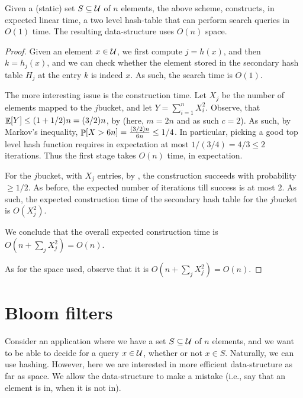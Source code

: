\begin{theorem}
    Given a (static) set $S \subseteq \mathcal{U}$ of $n$ elements, the above
    scheme, constructs, in expected linear time, a two level
    hash-table that can perform search queries in $O(1)$ time. The
    resulting data-structure uses $O(n)$ space.
\end{theorem}
\begin{proof}   
    Given an element $x \in \mathcal{U}$, we first compute $j = h(x)$, and
    then $k = h_j(x)$, and we can check whether the element stored in
    the secondary hash table $H_j$ at the entry $k$ is indeed $x$. As
    such, the search time is $O(1)$.

    The more interesting issue is the construction time.  Let $X_j$ be
    the number of elements mapped to the $j$\th bucket, and let
    $Y = \sum_{i=1}^n X_i^2$.  Observe, that
    $\mathop{\mathbb{E}}\!\left[ {Y} \right] \leq (1+ 1/2)n =(3/ 2)n$, by 
    (here, $m=2n$ and as such $c=2$). As such, by Markov's inequality,
    $\Prob{X > 6n} = \frac{(3/2)n}{6n} \leq 1/4$. In particular,
    picking a good top level hash function requires in expectation at
    most $1/(3/4)=4/3 \leq 2$ iterations. Thus the first stage takes
    $O(n)$ time, in expectation.

    For the $j$\th bucket, with $X_j$ entries, by
    , the construction succeeds with probability
    $\geq 1/2$. As before, the expected number of iterations till
    success is at most $2$. As such, the expected construction time of
    the secondary hash table for the $j$\th bucket is $O(X_j^2)$.

    We conclude that the overall expected construction time is
    $O( n + \sum_j X_j^2 ) = O(n)$.

    As for the space used, observe that it is $O(n + \sum_j X_j^2 ) =
    O(n)$.    
\end{proof}



\section{Bloom filters}

Consider an application where we have a set $S \subseteq \mathcal{U}$ of $n$
elements, and we want to be able to decide for a query $x \in \mathcal{U}$,
whether or not $x \in S$. Naturally, we can use hashing. However, here
we are interested in more efficient data-structure as far as space. We
allow the data-structure to make a mistake (i.e., say that an element
is in, when it is not in).

